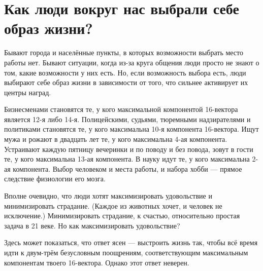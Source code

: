\documentclass[11pt]{article}
\theoremstyle{remark}
\theoremstyle{definition}
\begin{document}














\section{Как люди вокруг нас выбрали себе образ жизни?}

Бывают города и населённые пункты, в которых возможности выбрать место работы нет. Бывают ситуации, когда из-за круга общения люди просто не знают о том, какие возможности у них есть. Но, если возможность выбора есть, люди выбирают себе образ жизни в зависимости от того, что сильнее активирует их центры наград.

Бизнесменами становятся те, у кого максимальной компонентой 16-вектора является 12-я либо 14-я. Полицейскими, судьями, тюремными надзирателями и политиками становятся те, у кого максимальна 10-я компонента 16-вектора. Ищут мужа и рожают в двадцать лет те, у кого максимальна 4-ая компонента. Устраивают каждую пятницу вечеринки и по поводу и без повода, зовут в гости те, у кого максимальна 13-ая компонента. В науку идут те, у кого максимальна 2-ая компонента. Выбор человеком и места работы, и набора хобби --- прямое следствие физиологии его мозга. 

Вполне очевидно, что люди хотят максимизировать удовольствие и минимизировать страдание. (Каждое из животных хочет, и человек не исключение.) Минимизировать страдание, к счастью, относительно простая задача в 21 веке. Но как максимизировать удовольствие?





Здесь может показаться, что ответ ясен --- выстроить жизнь так, чтобы всё время идти к двум-трём безусловным поощрениям, соответствующим максимальным компонентам твоего 16-вектора. Однако этот ответ неверен. 
\end{document}
